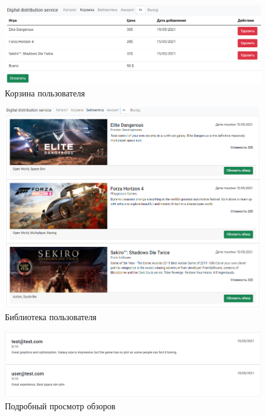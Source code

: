 \begin{figure}[ht]
	\centering
	  \includegraphics[scale=0.4]{attachments/cart.png}  
	  \caption{ Корзина пользователя }
	  \label{sec:user_guide:main:cart}
\end{figure}

\begin{figure}[ht]
	\centering
	  \includegraphics[scale=0.4]{attachments/library.png}  
	  \caption{ Библиотека пользователя }
	  \label{sec:user_guide:main:library}
\end{figure}

\begin{figure}[!htb]
	\centering
	  \includegraphics[scale=0.4]{attachments/reviews.png}  
	  \caption{ Подробный просмотр обзоров }
	  \label{sec:user_guide:main:reviews}
\end{figure}

